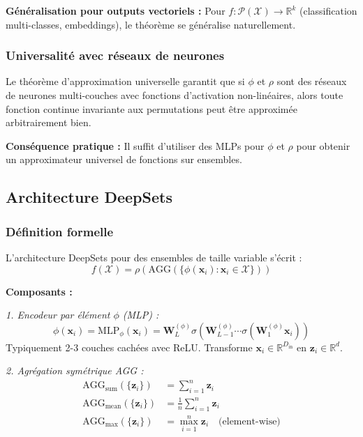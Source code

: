 \textbf{Généralisation pour outputs vectoriels :}
Pour $f: \mathcal{P}(\mathcal{X}) \to \mathbb{R}^k$ (classification multi-classes, embeddings), le théorème se généralise naturellement.

\subsubsection{Universalité avec réseaux de neurones}

Le théorème d'approximation universelle garantit que si $\phi$ et $\rho$ sont des réseaux de neurones multi-couches avec fonctions d'activation non-linéaires, alors toute fonction continue invariante aux permutations peut être approximée arbitrairement bien.

\textbf{Conséquence pratique :}
Il suffit d'utiliser des MLPs pour $\phi$ et $\rho$ pour obtenir un approximateur universel de fonctions sur ensembles.

\subsection{Architecture DeepSets}

\subsubsection{Définition formelle}

L'architecture DeepSets pour des ensembles de taille variable s'écrit :
\[
f(\mathcal{X}) = \rho\left(\text{AGG}\left(\{\phi(\mathbf{x}_i) : \mathbf{x}_i \in \mathcal{X}\}\right)\right)
\]

\textbf{Composants :}

\textit{1. Encodeur par élément $\phi$ (MLP) :}
\[
\phi(\mathbf{x}_i) = \text{MLP}_\phi(\mathbf{x}_i) = \mathbf{W}_L^{(\phi)} \sigma(\mathbf{W}_{L-1}^{(\phi)} \cdots \sigma(\mathbf{W}_1^{(\phi)} \mathbf{x}_i))
\]
Typiquement 2-3 couches cachées avec ReLU. Transforme $\mathbf{x}_i \in \mathbb{R}^{D_{\text{in}}}$ en $\mathbf{z}_i \in \mathbb{R}^{d}$.

\textit{2. Agrégation symétrique AGG :}
\begin{align*}
\text{AGG}_{\text{sum}}(\{\mathbf{z}_i\}) &= \sum_{i=1}^n \mathbf{z}_i \\
\text{AGG}_{\text{mean}}(\{\mathbf{z}_i\}) &= \frac{1}{n}\sum_{i=1}^n \mathbf{z}_i \\
\text{AGG}_{\text{max}}(\{\mathbf{z}_i\}) &= \max_{i=1}^n \mathbf{z}_i \quad \text{(element-wise)}
\end{align*}

